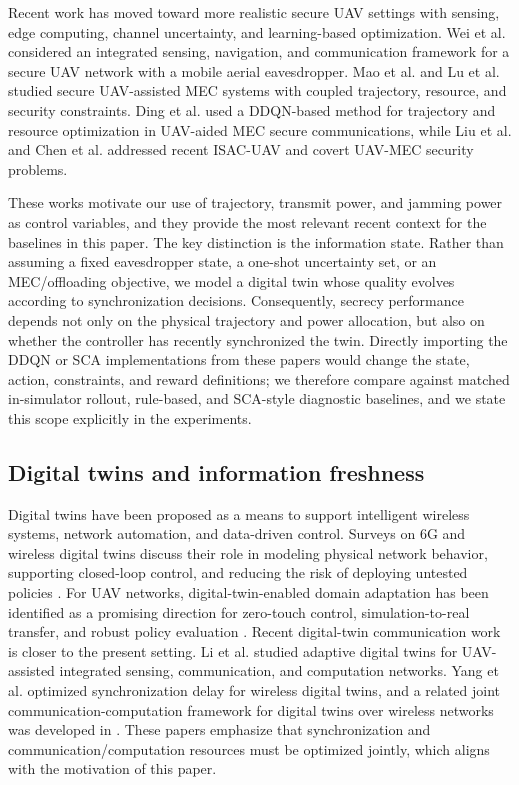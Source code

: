 Recent work has moved toward more realistic secure UAV settings with sensing, edge computing, channel uncertainty, and learning-based optimization. Wei et al. \cite{wei2024isncsecureuav} considered an integrated sensing, navigation, and communication framework for a secure UAV network with a mobile aerial eavesdropper. Mao et al. \cite{mao2023secureuavmec} and Lu et al. \cite{lu2024securemaritimemec} studied secure UAV-assisted MEC systems with coupled trajectory, resource, and security constraints. Ding et al. \cite{ding2024ddqnuavmec} used a DDQN-based method for trajectory and resource optimization in UAV-aided MEC secure communications, while Liu et al. \cite{liu2024secureisacuav} and Chen et al. \cite{chen2025covertuavmec} addressed recent ISAC-UAV and covert UAV-MEC security problems.

These works motivate our use of trajectory, transmit power, and jamming power as control variables, and they provide the most relevant recent context for the baselines in this paper. The key distinction is the information state. Rather than assuming a fixed eavesdropper state, a one-shot uncertainty set, or an MEC/offloading objective, we model a digital twin whose quality evolves according to synchronization decisions. Consequently, secrecy performance depends not only on the physical trajectory and power allocation, but also on whether the controller has recently synchronized the twin. Directly importing the DDQN or SCA implementations from these papers would change the state, action, constraints, and reward definitions; we therefore compare against matched in-simulator rollout, rule-based, and SCA-style diagnostic baselines, and we state this scope explicitly in the experiments.

\subsection{Digital twins and information freshness}

Digital twins have been proposed as a means to support intelligent wireless systems, network automation, and data-driven control. Surveys on 6G and wireless digital twins discuss their role in modeling physical network behavior, supporting closed-loop control, and reducing the risk of deploying untested policies \cite{kuruvatti2022digital}. For UAV networks, digital-twin-enabled domain adaptation has been identified as a promising direction for zero-touch control, simulation-to-real transfer, and robust policy evaluation \cite{mcmanus2023digital}.
Recent digital-twin communication work is closer to the present setting. Li et al. \cite{li2023adaptivedt} studied adaptive digital twins for UAV-assisted integrated sensing, communication, and computation networks. Yang et al. \cite{yang2024syncdelay} optimized synchronization delay for wireless digital twins, and a related joint communication-computation framework for digital twins over wireless networks was developed in \cite{yang2024jointdt}. These papers emphasize that synchronization and communication/computation resources must be optimized jointly, which aligns with the motivation of this paper.

